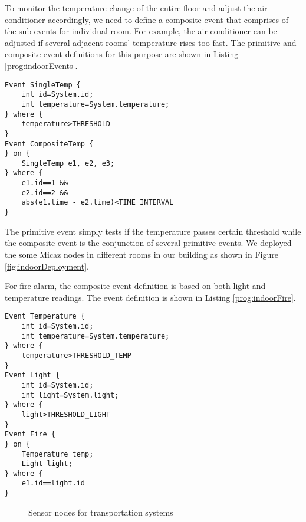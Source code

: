 To monitor the temperature change of the entire floor and adjust the air-conditioner accordingly, we need to define a composite event that comprises of the sub-events for individual room. For example, the air conditioner can be adjusted if several adjacent rooms' temperature rises too fast. The primitive and composite event definitions for this purpose are shown in Listing \ref{prog:indoorEvents}.

\begin{lstlisting}[caption=Event definition for temperature monitoring, label=prog:indoorEvents]
Event SingleTemp {
	int id=System.id;
	int temperature=System.temperature;
} where {
	temperature>THRESHOLD
}
Event CompositeTemp {
} on {
	SingleTemp e1, e2, e3;
} where {
	e1.id==1 &&
	e2.id==2 &&
	abs(e1.time - e2.time)<TIME_INTERVAL
}
\end{lstlisting}

The primitive event simply tests if the temperature passes certain threshold while the composite event is the conjunction of several primitive events. We deployed the some Micaz nodes in different rooms in our building as shown in Figure \ref{fig:indoorDeployment}.

For fire alarm, the composite event definition is based on both light and temperature readings. The event definition is shown in Listing \ref{prog:indoorFire}.
\begin{lstlisting}[caption=Event definition for fire alarm, label=prog:indoorFire]
Event Temperature {
	int id=System.id;
	int temperature=System.temperature;
} where {
	temperature>THRESHOLD_TEMP
}
Event Light {
	int id=System.id;
	int light=System.light;
} where {
	light>THRESHOLD_LIGHT
}
Event Fire {
} on {
	Temperature temp;
	Light light;
} where {
	e1.id==light.id
}
\end{lstlisting}

\begin{figure}
\centering
{}
\caption{Sensor nodes for transportation systems}
\label{fig:itsSensor}
\end{figure}

